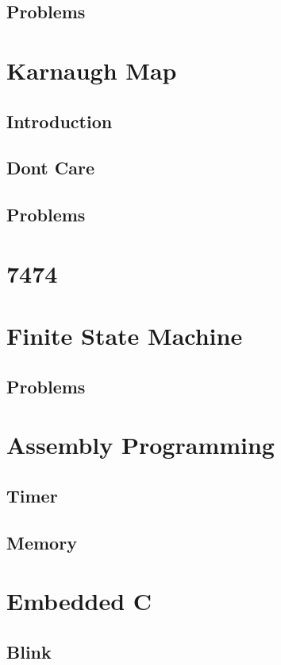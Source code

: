 \documentclass[11pt]{book}
\begin{document}
\section{Problems}

\chapter{Karnaugh Map}
\section{Introduction}

\section{Dont Care}

\section{Problems}

\chapter{7474}

\chapter{Finite State Machine}

\section{Problems}

\chapter{Assembly Programming}




\section{Timer}

\section{Memory}

\chapter{Embedded C}
\section{Blink}



\end{document}
